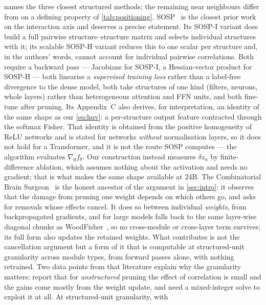 \label{app:related-ext}
 names the three closest structured methods; the remaining near neighbours differ
from \method on a defining property of \cref{tab:positioning}. SOSP~\citep{nonnenmacher2022sosp} is the closest
prior work on the interaction axis and deserves a precise statement. Its SOSP-I variant does build a
full pairwise structure--structure matrix and selects individual structures with it; its scalable
SOSP-H variant reduces this to one scalar per structure and, in the authors' words, cannot account for
individual pairwise correlations. Both require a backward pass --- Jacobians for SOSP-I, a
Hessian-vector product for SOSP-H --- both linearise a \emph{supervised training loss} rather than a
label-free divergence to the dense model, both take structures of one kind (filters, neurons, whole
layers) rather than heterogeneous attention and FFN units, and both fine-tune after pruning. Its
Appendix~C also derives, for interpretation, an identity of the same shape as our \cref{eq:huv}: a
per-structure output feature contracted through the softmax Fisher. That identity is obtained from the
positive homogeneity of ReLU networks and is stated for networks \emph{without} normalisation layers, so
it does not hold for a Transformer, and it is not the route SOSP computes --- the algorithm evaluates
$\nabla_\theta f_\theta$. Our construction instead measures $\delta z_u$ by finite-difference ablation,
which assumes nothing about the activation and needs no gradient; that is what makes the same shape
available at $24$B. The Combinatorial Brain Surgeon~\citep{yu2022cbs} is the honest
ancestor of the argument in \cref{sec:intro}: it observes that the damage from pruning one weight
depends on which others go, and asks for removals whose effects cancel. It does so between individual
\emph{weights}, from backpropagated gradients, and for large models falls back to the same layer-wise
diagonal chunks as WoodFisher~\citep{singh2020woodfisher}, so no cross-module or cross-layer term
survives; its full form also updates the retained weights. What \method contributes is not the
cancellation argument but a form of it that is computable at structured-unit granularity across module
types, from forward passes alone, with nothing retrained. Two data points from that literature explain
why the granularity matters: \citet{frantar2021mfac} report that for \emph{unstructured} pruning the
effect of correlation is small and the gains come mostly from the weight update, and
\citet{yu2022cbs} need a mixed-integer solve to exploit it at all. At structured-unit granularity, with
